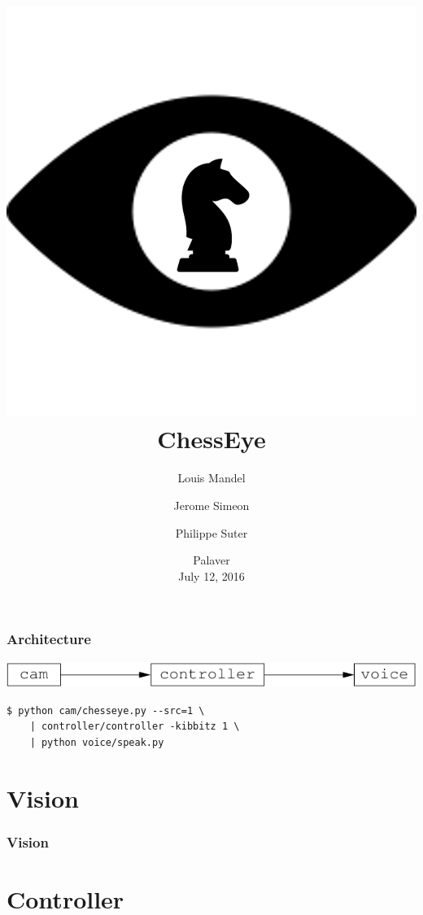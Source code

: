 \documentclass[t]{beamer}
\title{\includegraphics[scale=0.1]{figures/chesseye}
  \\
  ChessEye}
\author{Louis Mandel \and Jerome Simeon \and Philippe Suter}
\date{Palaver \\ July 12, 2016}
\begin{document}

\begin{frame}
  \titlepage
\end{frame}




\begin{frame}[fragile]
\frametitle{Architecture}

\begin{center}
  \includegraphics[scale=0.9]{figures/architecture}
\end{center}
\medskip

{\small
\begin{verbatim}
$ python cam/chesseye.py --src=1 \
    | controller/controller -kibbitz 1 \
    | python voice/speak.py
\end{verbatim}
}

\end{frame}


\section{Vision}

\begin{frame}[fragile]
\frametitle{Vision}


\end{frame}


\section{Controller}
\end{document}
